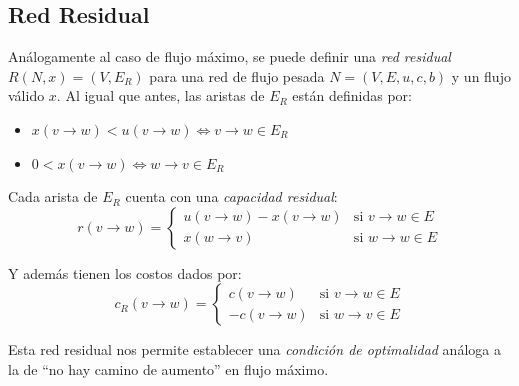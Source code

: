 \documentclass[a4paper]{report}
\newcommand{\si}{\text{si }}
\begin{document}
\subsection{Red Residual}

Análogamente al caso de flujo máximo, se puede definir una \textit{red residual} $R(N, x) = (V, E_R)$ para una red de flujo pesada $N = (V, E, u, c, b)$ y un flujo válido $x$. Al igual que antes, las aristas de $E_R$ están definidas por:
\begin{itemize}
    \item $x(v \rightarrow w) < u(v \rightarrow w) \iff v \rightarrow w \in E_R$
    \item $0 < x(v \rightarrow w) \iff w \rightarrow v \in E_R$
\end{itemize}

Cada arista de $E_R$ cuenta con una \textit{capacidad residual}:
$$
r(v \rightarrow w) =
\begin{cases}
    u(v \rightarrow w) - x(v \rightarrow w) & \si v \rightarrow w \in E \\
    x(w \rightarrow v)                      & \si w \rightarrow w \in E
\end{cases}
$$

Y además tienen los costos dados por:
$$
c_R(v \rightarrow w) =
\begin{cases}
    c(v \rightarrow w) & \si v \rightarrow w \in E \\
    -c(v \rightarrow w) & \si w \rightarrow v \in E
\end{cases}
$$

Esta red residual nos permite establecer una \textit{condición de optimalidad} análoga a la de ``no hay camino de aumento'' en flujo máximo.
\end{document}
